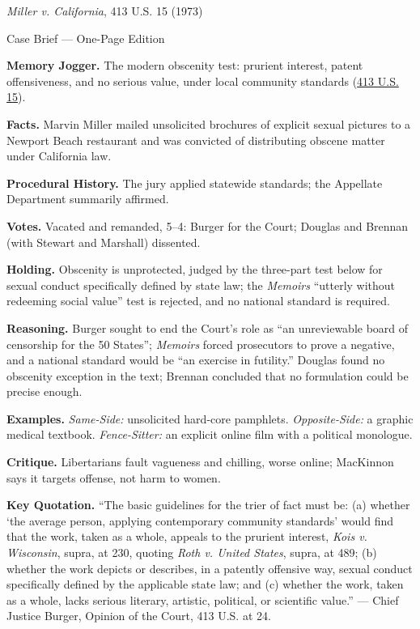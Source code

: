 \documentclass[12pt]{article}
\begin{document}
\begin{center}
{\Large \textit{Miller v. California}, 413 U.S. 15 (1973)\par}
\vspace{0.3em}
{\normalsize Case Brief --- One-Page Edition\par}
\end{center}

\textbf{Memory Jogger.} The modern obscenity test: prurient interest, patent offensiveness, and no serious value, under local community standards (\href{https://supreme.justia.com/cases/federal/us/413/15/}{413 U.S. 15}).

\textbf{Facts.} Marvin Miller mailed unsolicited brochures of explicit sexual pictures to a Newport Beach restaurant and was convicted of distributing obscene matter under California law.

\textbf{Procedural History.} The jury applied statewide standards; the Appellate Department summarily affirmed.

\textbf{Votes.} Vacated and remanded, 5--4: Burger for the Court; Douglas and Brennan (with Stewart and Marshall) dissented.

\textbf{Holding.} Obscenity is unprotected, judged by the three-part test below for sexual conduct specifically defined by state law; the \textit{Memoirs} ``utterly without redeeming social value'' test is rejected, and no national standard is required.

\textbf{Reasoning.} Burger sought to end the Court's role as ``an unreviewable board of censorship for the 50 States''; \textit{Memoirs} forced prosecutors to prove a negative, and a national standard would be ``an exercise in futility.'' Douglas found no obscenity exception in the text; Brennan concluded that no formulation could be precise enough.

\textbf{Examples.} \emph{Same-Side:} unsolicited hard-core pamphlets. \emph{Opposite-Side:} a graphic medical textbook. \emph{Fence-Sitter:} an explicit online film with a political monologue.

\textbf{Critique.} Libertarians fault vagueness and chilling, worse online; MacKinnon says it targets offense, not harm to women.

\textbf{Key Quotation.} ``The basic guidelines for the trier of fact must be: (a) whether `the average person, applying contemporary community standards' would find that the work, taken as a whole, appeals to the prurient interest, \textit{Kois v. Wisconsin}, supra, at 230, quoting \textit{Roth v. United States}, supra, at 489; (b) whether the work depicts or describes, in a patently offensive way, sexual conduct specifically defined by the applicable state law; and (c) whether the work, taken as a whole, lacks serious literary, artistic, political, or scientific value.'' --- Chief Justice Burger, Opinion of the Court, 413 U.S. at 24.
\end{document}
